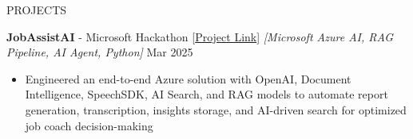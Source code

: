 \documentclass{resume} %
\begin{document}
\begin{rSection}{PROJECTS}

    \textbf{JobAssistAI} - Microsoft Hackathon [\href{https://github.com/harshitjain17/JobAssistAI}{Project Link}] \textit{[Microsoft Azure AI, RAG Pipeline, AI Agent, Python]} \hfill Mar 2025
    \begin{itemize}[itemsep = -4pt]
        \item Engineered an end-to-end Azure solution with OpenAI, Document Intelligence, SpeechSDK, AI Search, and RAG models to automate report generation, transcription, insights storage, and AI-driven search for optimized job coach decision-making
    \end{itemize}
    
\end{rSection}
\end{document}
